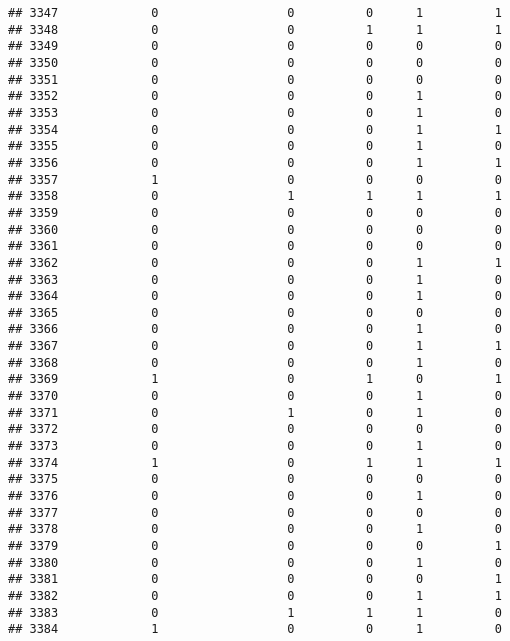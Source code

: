 \documentclass[
]{article}
\begin{document}
\begin{verbatim}
## 3347             0                  0          0      1          1
## 3348             0                  0          1      1          1
## 3349             0                  0          0      0          0
## 3350             0                  0          0      0          0
## 3351             0                  0          0      0          0
## 3352             0                  0          0      1          0
## 3353             0                  0          0      1          0
## 3354             0                  0          0      1          1
## 3355             0                  0          0      1          0
## 3356             0                  0          0      1          1
## 3357             1                  0          0      0          0
## 3358             0                  1          1      1          1
## 3359             0                  0          0      0          0
## 3360             0                  0          0      0          0
## 3361             0                  0          0      0          0
## 3362             0                  0          0      1          1
## 3363             0                  0          0      1          0
## 3364             0                  0          0      1          0
## 3365             0                  0          0      0          0
## 3366             0                  0          0      1          0
## 3367             0                  0          0      1          1
## 3368             0                  0          0      1          0
## 3369             1                  0          1      0          1
## 3370             0                  0          0      1          0
## 3371             0                  1          0      1          0
## 3372             0                  0          0      0          0
## 3373             0                  0          0      1          0
## 3374             1                  0          1      1          1
## 3375             0                  0          0      0          0
## 3376             0                  0          0      1          0
## 3377             0                  0          0      0          0
## 3378             0                  0          0      1          0
## 3379             0                  0          0      0          1
## 3380             0                  0          0      1          0
## 3381             0                  0          0      0          1
## 3382             0                  0          0      1          1
## 3383             0                  1          1      1          0
## 3384             1                  0          0      1          0

\end{verbatim}
\end{document}
